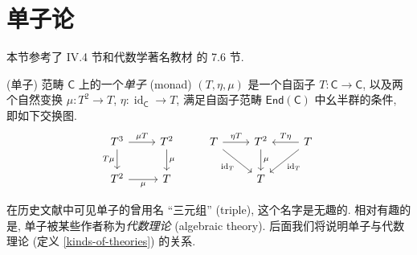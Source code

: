 
\section{单子论}

本节参考了 \cite{SGL} IV.4 节和代数学著名教材 \cite{lww2} 的 7.6 节.

\begin{definition}
    [label={monad-definition}]
    {(单子)}
    范畴 $\mathsf C$ 上的一个\emph{单子} (monad) $(T,\eta,\mu)$ 是一个自函子 $T \colon \mathsf C \to \mathsf C$, 以及两个自然变换 $\mu\colon T^2 \to T$, $\eta \colon \operatorname{id}_{\mathsf C} \to T$, 满足自函子范畴 $\mathsf {End}(\mathsf C)$ 中幺半群的条件, 即如下交换图.
\[\begin{tikzcd}[ampersand replacement=\&]
	{T^3} \& {T^2} \& {T} \& {T^2} \& {T} \\
	{T^2} \& T \&\& T
	\arrow["{\mu T}", from=1-1, to=1-2]
	\arrow["T\mu"', from=1-1, to=2-1]
	\arrow["\mu"', from=2-1, to=2-2]
	\arrow["\mu", from=1-2, to=2-2]
	\arrow["\mu", from=1-4, to=2-4]
	\arrow["{\operatorname{id}_T}"', from=1-3, to=2-4]
	\arrow["{\operatorname{id}_T}", from=1-5, to=2-4]
	\arrow["{\eta T}", from=1-3, to=1-4]
	\arrow["T\eta"', from=1-5, to=1-4]
\end{tikzcd}\]
\end{definition}

\begin{remark}
	{}
	在历史文献中可见单子的曾用名 ``三元组'' (triple), 这个名字是无趣的.
	相对有趣的是, 单子被某些作者称为\emph{代数理论} (algebraic theory). 后面我们将说明单子与代数理论 (定义 \ref{kinds-of-theories}) 的关系.
\end{remark}

